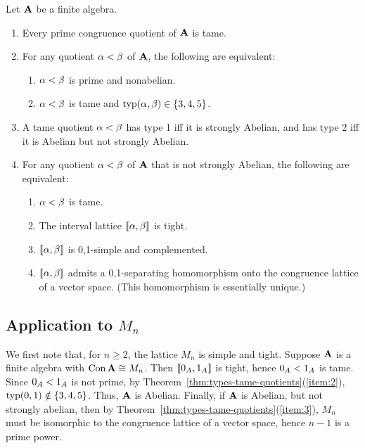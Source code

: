 \begin{theorem} 
\label{thm:types-tame-quotients}
Let $\mathbf{A}$ be a finite algebra.  
\begin{enumerate}[\rm(1)]
\item Every prime congruence quotient of $\mathbf{A}$ is tame.
\item \label{item:2}
  For any quotient $\alpha < \beta$ of $\mathbf{A}$, the following are equivalent:
  \begin{enumerate}[\rm(i)]
  \item $\alpha < \beta$ is prime and nonabelian.
  \item $\alpha < \beta$ is tame and $\operatorname{typ}(\alpha, \beta)\in \{3,4,5\}$.
  \end{enumerate}
\item A tame quotient $\alpha < \beta$ has type 1 iff it is strongly Abelian, and has type 2 
  iff it is Abelian but not strongly Abelian.
\item  \label{item:3}
  For any quotient $\alpha < \beta$ of $\mathbf{A}$ that is not strongly Abelian, the following are
  equivalent:
  \begin{enumerate}[\rm(i)]
  \item $\alpha < \beta$ is tame.
  \item The interval lattice $\llbracket\alpha, \beta \rrbracket$ is tight.
  \item $\llbracket\alpha, \beta \rrbracket$  is 0,1-simple and complemented.
  \item  $\llbracket\alpha, \beta \rrbracket$  admits a 0,1-separating homomorphism onto the congruence 
    lattice of a vector space. (This homomorphism is essentially unique.)
  \end{enumerate}
\end{enumerate}
\end{theorem}

\subsection{Application to $M_n$}
We first note that, for $n\geq 2$, the lattice $M_n$ 
is simple and tight.
Suppose $\mathbf{A}$ is a finite algebra with $\operatorname{Con} \mathbf{A}\cong M_n$. 
Then $\llbracket 0_A,1_A \rrbracket$ is tight, hence $0_A < 1_A$ is tame. 
Since $0_A < 1_A$ is not prime, by 
Theorem~\ref{thm:types-tame-quotients}(\ref{item:2}),
$\operatorname{typ}(0,1) \notin \{3,4,5\}$. Thus, $\mathbf{A}$ is Abelian.
Finally, if $\mathbf{A}$ is Abelian, but not strongly abelian, then by 
Theorem~\ref{thm:types-tame-quotients}(\ref{item:3}),
$M_n$ must be isomorphic to the congruence lattice of a vector space, 
hence $n-1$ is a prime power.

